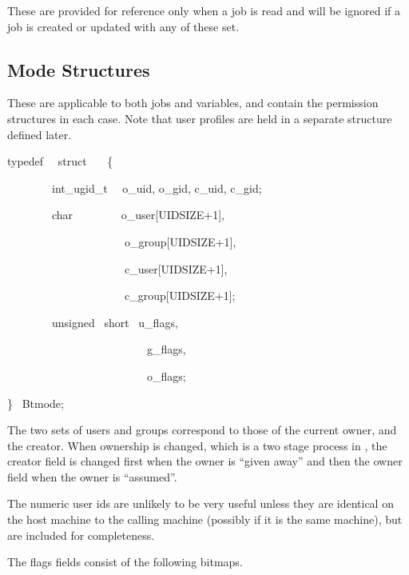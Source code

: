 These are provided for reference only when a job is read and will be ignored if a job is created or updated with any of these set.

\subsection{Mode Structures}
These are applicable to both jobs and variables, and contain the permission structures in each case. Note that user profiles are held in
a separate structure defined later.

\begin{expara}

typedef \ \ struct \ \ \ \{

\ \ \ \ \ \ \ \ int\_ugid\_t \ \ o\_uid, o\_gid, c\_uid, c\_gid;

\ \ \ \ \ \ \ \ char \ \ \ \ \ \ \ \ o\_user[UIDSIZE+1],

\ \ \ \ \ \ \ \ \ \ \ \ \ \ \ \ \ \ \ \ \ o\_group[UIDSIZE+1],

\ \ \ \ \ \ \ \ \ \ \ \ \ \ \ \ \ \ \ \ \ c\_user[UIDSIZE+1],

\ \ \ \ \ \ \ \ \ \ \ \ \ \ \ \ \ \ \ \ \ c\_group[UIDSIZE+1];

\ \ \ \ \ \ \ \ unsigned \ short \ u\_flags,

\ \ \ \ \ \ \ \ \ \ \ \ \ \ \ \ \ \ \ \ \ \ \ \ \ g\_flags,

\ \ \ \ \ \ \ \ \ \ \ \ \ \ \ \ \ \ \ \ \ \ \ \ \ o\_flags;

\} \ Btmode;

\end{expara}

The two sets of users and groups correspond to those of the current owner, and the creator. When ownership is changed, which is a two stage
process in \ProductName{}, the creator field is changed first when the owner is ``given away'' and then the
owner field when the owner is ``assumed''.

The numeric user ids are unlikely to be very useful unless they are identical on the host machine to the calling machine (possibly if it is
the same machine), but are included for completeness.

The flags fields consist of the following bitmaps.

